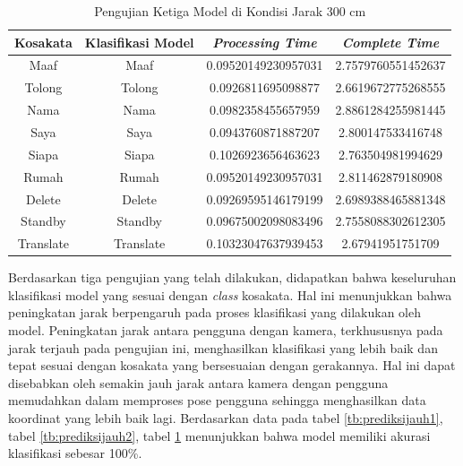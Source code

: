 \begin{longtable}{|c|c|c|c|}
  \caption{Pengujian Ketiga Model di Kondisi Jarak 300 cm}
  \label{tb:prediksijauh3}                                   \\
  \hline
  \rowcolor[HTML]{C0C0C0}
  \textbf{Kosakata} & \textbf{Klasifikasi Model} & \textbf{\emph{Processing Time}} & \textbf{\emph{Complete Time}}\\
  \hline
  Maaf              & Maaf                        & 0.09520149230957031                           & 2.7579760551452637                                  \\
  Tolong            & Tolong                        & 0.0926811695098877                           & 2.6619672775268555                                  \\
  Nama              & Nama                        & 0.0982358455657959                           & 2.8861284255981445                                  \\
  Saya              & Saya                        & 0.0943760871887207                           & 2.800147533416748                                  \\
  Siapa              & Siapa                        & 0.1026923656463623                           & 2.763504981994629                                  \\
  Rumah             & Rumah                        & 0.09520149230957031                           & 2.811462879180908                                  \\
  Delete            & Delete                        & 0.09269595146179199                           & 2.6989388465881348                                  \\
  Standby           & Standby                        & 0.09675002098083496                           & 2.7558088302612305                                  \\
  Translate         & Translate                        & 0.10323047637939453                           & 2.67941951751709                                  \\
  \hline
\end{longtable}

Berdasarkan tiga pengujian yang telah dilakukan, didapatkan bahwa keseluruhan klasifikasi model yang sesuai dengan \emph{class} kosakata. Hal ini menunjukkan bahwa peningkatan jarak berpengaruh pada proses klasifikasi yang dilakukan oleh model. Peningkatan jarak antara pengguna dengan kamera, terkhususnya pada jarak terjauh pada pengujian ini, menghasilkan klasifikasi yang lebih baik dan tepat sesuai dengan kosakata yang bersesuaian dengan gerakannya. Hal ini dapat disebabkan oleh semakin jauh jarak antara kamera dengan pengguna memudahkan dalam memproses pose pengguna sehingga menghasilkan data koordinat yang lebih baik lagi. Berdasarkan data pada tabel \ref{tb:prediksijauh1}, tabel \ref{tb:prediksijauh2}, tabel \ref{tb:prediksijauh3} menunjukkan bahwa model memiliki akurasi klasifikasi sebesar 100\%.


